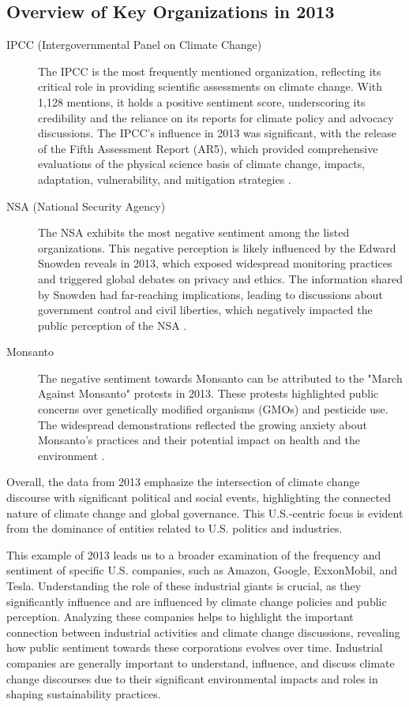 \subsection{Overview of Key Organizations in 2013}
\begin{description}
    \item[IPCC (Intergovernmental Panel on Climate Change)] The IPCC is the most frequently mentioned organization, reflecting its critical role in providing scientific assessments on climate change. With 1,128 mentions, it holds a positive sentiment score, underscoring its credibility and the reliance on its reports for climate policy and advocacy discussions. The IPCC's influence in 2013 was significant, with the release of the Fifth Assessment Report (AR5), which provided comprehensive evaluations of the physical science basis of climate change, impacts, adaptation, vulnerability, and mitigation strategies \cite{ipcc2013}.
    \item[NSA (National Security Agency)] The NSA exhibits the most negative sentiment among the listed organizations. This negative perception is likely influenced by the Edward Snowden reveals in 2013, which exposed widespread monitoring practices and triggered global debates on privacy and ethics. The  information shared by Snowden had far-reaching implications, leading to discussions about government control and civil liberties, which negatively impacted the public perception of the NSA \cite{lanchester2013}.
    \item[Monsanto] The negative sentiment towards Monsanto can be attributed to the "March Against Monsanto" protests in 2013. These protests highlighted public concerns over genetically modified organisms (GMOs) and pesticide use. The widespread demonstrations reflected the growing anxiety about Monsanto's practices and their potential impact on health and the environment \cite{guardian2013}.
\end{description}

Overall, the data from 2013 emphasize the intersection of climate change discourse with significant political and social events, highlighting the
connected nature of climate change and global governance. This U.S.-centric focus is evident from the dominance of entities related to U.S. politics and industries.

This example of 2013 leads us to a broader examination of the frequency and sentiment of specific U.S. companies, such as Amazon, Google, ExxonMobil, and Tesla. Understanding the role of these industrial giants is crucial, as they significantly influence and are influenced by climate change policies and public perception. Analyzing these companies helps to highlight the important connection between industrial activities and climate change discussions, revealing how public sentiment towards these corporations evolves over time. Industrial companies are generally important to understand, influence, and discuss climate change discourses due to their significant environmental impacts and roles in shaping sustainability practices.

